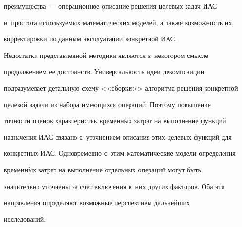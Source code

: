 преимущества~--- операционное описание решения целевых задач ИАС 


и~простота используемых математических моделей, а также возможность их 


корректировки по данным эксплуатации конкретной ИАС.


      


      Недостатки представленной методики являются в~некотором смысле 


продолжением ее достоинств. Универсальность идеи декомпозиции 


подразумевает детальную схему <<сборки>> алгоритма решения конкретной 


целевой задачи из набора имеющихся операций. Поэтому повышение 


точности оценок характеристик временн$\acute{\mbox{ы}}$х затрат на выполнение функций 


назначения ИАС связано с~уточнением описания этих целевых функций для 


конкретных ИАС. Одновременно с~этим математические модели определения 


временн$\acute{\mbox{ы}}$х затрат на выполнение отдельных операций могут быть 


значительно уточнены за счет включения в~них других факторов. Оба эти 


направления определяют возможные перспективы дальнейших 


исследований.


      



